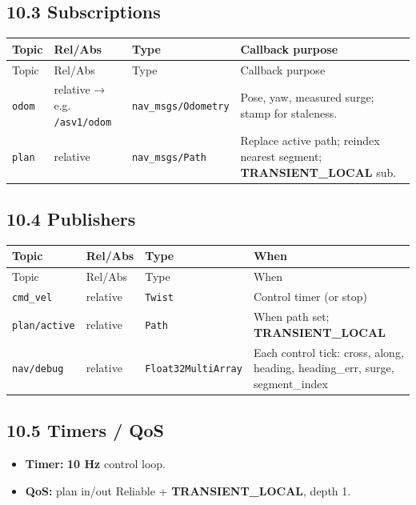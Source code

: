 \subsection{10.3 Subscriptions}


\begin{center}
\small
\begin{longtable}{@{}lllp{5.2cm}@{}}
\toprule
Topic & Rel/Abs & Type & Callback purpose \\
\midrule
\endfirsthead
\toprule
Topic & Rel/Abs & Type & Callback purpose \\
\midrule
\endhead
\texttt{odom} & relative → e.g. \texttt{/asv1/odom} & \texttt{nav\_msgs/Odometry} & Pose, yaw, measured surge; stamp for staleness. \\
\texttt{plan} & relative & \texttt{nav\_msgs/Path} & Replace active path; reindex nearest segment; \textbf{TRANSIENT\_LOCAL} sub. \\
\bottomrule
\end{longtable}
\end{center}


\subsection{10.4 Publishers}


\begin{center}
\small
\begin{longtable}{@{}lllp{5.2cm}@{}}
\toprule
Topic & Rel/Abs & Type & When \\
\midrule
\endfirsthead
\toprule
Topic & Rel/Abs & Type & When \\
\midrule
\endhead
\texttt{cmd\_vel} & relative & \texttt{Twist} & Control timer (or stop) \\
\texttt{plan/active} & relative & \texttt{Path} & When path set; \textbf{TRANSIENT\_LOCAL} \\
\texttt{nav/debug} & relative & \texttt{Float32MultiArray} & Each control tick: cross, along, heading, heading\_err, surge, segment\_index \\
\bottomrule
\end{longtable}
\end{center}


\subsection{10.5 Timers / QoS}


\begin{itemize}[leftmargin=*]
\item \textbf{Timer:} \textbf{10 Hz} control loop.
\item \textbf{QoS:} plan in/out Reliable + \textbf{TRANSIENT\_LOCAL}, depth 1.
\end{itemize}


